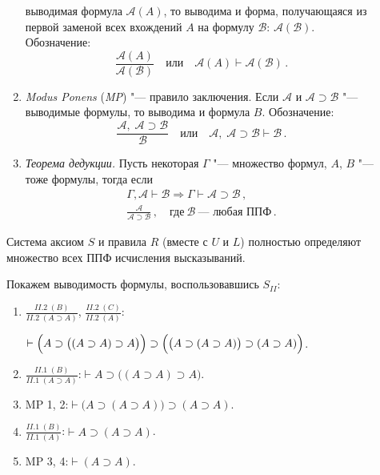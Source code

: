 \begin{description}
\begin{enumerate}
выводимая формула $\mathcal A (A)$, то выводима и форма, получающаяся
из первой заменой всех вхождений $A$ на формулу $\mathcal B$:
$\mathcal{A(B)}$. Обозначение:
    $$ \frac{\mathcal A (A)}{\mathcal A (\mathcal B)}\quad или\quad
    \mathcal A (A) \vdash \mathcal A (\mathcal B)\,.
    $$
  \item \emph{Modus Ponens} (\emph{MP}) "--- правило заключения. Если
$\mathcal A$ и $\mathcal{A\supset B}$ "--- выводимые формулы, то
выводима и формула $B$. Обозначение:
    $$ \mathcal{\frac{A,\;A\supset B}B}\quad или\quad
    \mathcal{A,\;A\supset B\vdash B}\,.
    $$
  \item \emph{Теорема дедукции.} Пусть некоторая $\Gamma$ "---
множество формул, $A$, $B$ "--- тоже формулы, тогда если
    \begin{gather*} \Gamma,\mathcal A\vdash \mathcal B \Rightarrow
\Gamma \vdash \mathcal A \supset \mathcal B\,,\\ \frac{\mathcal
A}{\mathcal{A\supset B}}\,,\quad \text{где}\ \mathcal B\ \text{---
любая ППФ}\,.
    \end{gather*}
  \end{enumerate}
  \begin{rem} Система аксиом $S$ и правила $R$ (вместе с $U$ и $L$)
полностью определяют множество всех ППФ исчисления высказываний.
  \end{rem}

  \begin{ex} Покажем
выводимость формулы, воспользовавшись $S_{II}$:
    \begin{enumerate}
    \item $\frac{II.2\;(B)}{II.2\;(A\supset A)}$,
$\frac{II.2\;(C)}{II.2\;(A)}$:

      $\vdash\Bigl(A\supset\bigl(\left(A\supset A\right)\supset
A\bigr)\Bigr)\supset\Bigl(\bigl(A\supset\left(A\supset
A\right)\bigr)\supset\left(A\supset A\right)\Bigr)$.
    \item $\frac{II.1\;(B)}{II.1\;(A\supset A)}$:\quad $\vdash
A\supset\bigl(\left(A\supset A\right)\supset A\bigr)$.
    \item MP 1, 2:\quad $\vdash\bigl(A\supset\left(A\supset
A\right)\bigr)\supset\left(A\supset A\right)$.
    \item $\frac{II.1\;(B)}{II.1\;(A)}$:\quad $\vdash
A\supset(A\supset A)$.
    \item MP 3, 4:\quad $\vdash(A\supset A)$.
    \end{enumerate}
  \end{ex}
\end{description}

